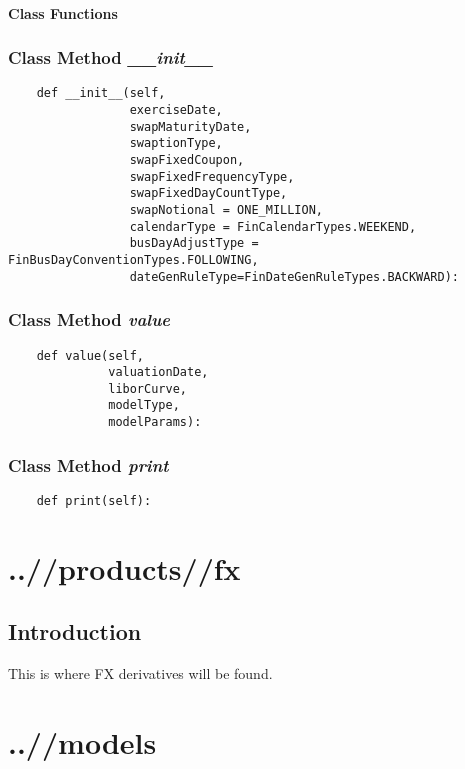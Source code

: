 \documentclass[twoside,11pt]{book}
\begin{document}
\subsubsection{Class Functions}

\subsection{Class Method {\it \_\_init\_\_}}


\begin{lstlisting}
    def __init__(self, 
                 exerciseDate,
                 swapMaturityDate,
                 swaptionType,
                 swapFixedCoupon,
                 swapFixedFrequencyType,
                 swapFixedDayCountType,
                 swapNotional = ONE_MILLION, 
                 calendarType = FinCalendarTypes.WEEKEND,
                 busDayAdjustType = FinBusDayConventionTypes.FOLLOWING,
                 dateGenRuleType=FinDateGenRuleTypes.BACKWARD):
\end{lstlisting}

\subsection{Class Method {\it value}}


\begin{lstlisting}
    def value(self, 
              valuationDate,
              liborCurve, 
              modelType, 
              modelParams):
\end{lstlisting}

\subsection{Class Method {\it print}}


\begin{lstlisting}
    def print(self):
\end{lstlisting}


\chapter{..//products//fx}
\section{Introduction}
This is where FX derivatives will be found.

\chapter{..//models}
\end{document}
